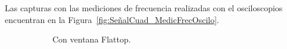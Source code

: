       Las capturas con las mediciones de frecuencia realizadas con el osciloscopios encuentran en la 
      Figura~\ref{fig:SeñalCuad_MedicFrecOscilo}.

      \begin{figure}[H]
        \centering
        \begin{subfigure}[H]{0.40\textwidth}
          \caption{Con ventana Flattop.}
        \end{subfigure}
        \hfill 
        \begin{subfigure}[H]{0.40\textwidth}

\end{subfigure}
\end{figure}
